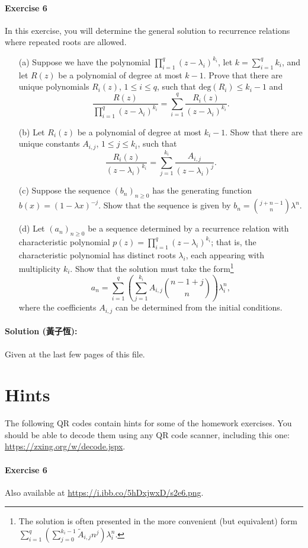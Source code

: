 \documentclass[a4paper,12pt]{article}
\renewcommand{\deg}{\textrm{deg}}
\begin{document}
\paragraph{Exercise 6}  In this exercise, you will determine the general solution to recurrence relations where repeated roots are allowed.

\begin{itemize}
	\item[(a)] Suppose we have the polynomial $\prod_{i=1}^q \left( z - \lambda_i \right)^{k_i}$, let $k = \sum_{i=1}^q k_i$, and let $R(z)$ be a polynomial of degree at most $k-1$. Prove that there are unique polynomials $R_i(z)$, $1 \le i \le q$, such that $\deg(R_i) \le k_i - 1$ and 
\[ \frac{R(z)}{\prod_{i=1}^q ( z - \lambda_i )^{k_i}} = \sum_{i=1}^q \frac{R_i(z)}{ (z - \lambda_i )^{k_i} }. \]
	\item[(b)] Let $R_i(z)$ be a polynomial of degree at most $k_i - 1$. Show that there are unique constants $A_{i,j}$, $1 \le j \le k_i$, such that
\[ \frac{R_i(z)}{(z - \lambda_i)^{k_i}} = \sum_{j=1}^{k_i} \frac{A_{i,j}}{(z - \lambda_i)^j}. \]
	\item[(c)] Suppose the sequence $(b_n)_{n \ge 0}$ has the generating function $b(x) = (1 - \lambda x)^{-j}$.  Show that the sequence is given by $b_n = \binom{j + n - 1}{n} \lambda^n$.
	\item[(d)] Let $(a_n)_{n \ge 0}$ be a sequence determined by a recurrence relation with characteristic polynomial $p(z) = \prod_{i = 1}^q (z - \lambda_i)^{k_i}$; that is, the characteristic polynomial has distinct roots $\lambda_i$, each appearing with multiplicity $k_i$.  Show that the solution must take the form\footnote{The solution is often presented in the more convenient (but equivalent) form $\sum_{i=1}^q \left( \sum_{j=0}^{k_i - 1} \tilde{A}_{i,j} n^{j} \right) \lambda_i^n$.}
\[ a_n = \sum_{i=1}^q \left( \sum_{j = 1}^{k_i} A_{i,j} \binom{n-1+j}{n} \right) \lambda_i^n, \]
where the coefficients $A_{i,j}$ can be determined from the initial conditions.
\end{itemize}
\vspace{-1em}
\paragraph{Solution (黃子恆):} Given at the last few pages of this file.
\newpage

\section*{Hints}  The following QR codes contain hints for some of the homework exercises.  You should be able to decode them using any QR code scanner, including this one: \url{https://zxing.org/w/decode.jspx}.

\paragraph{Exercise 6} Also available at \url{https://i.ibb.co/5hDxjwxD/s2e6.png}.


\end{document}
